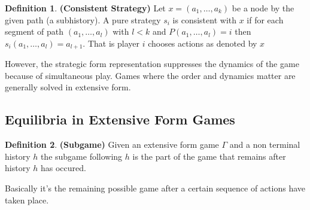 \documentclass{article}
\theoremstyle{definition}
\newtheorem{defn}{Definition}[section]
\begin{document}
\begin{defn}
\textbf{(Consistent Strategy)} Let $x=(a_1,\dots,a_k)$ be a node by the given path (a subhistory). A pure strategy $s_i$ is consistent with $x$ if for each segment of path $(a_1,\dots,a_l)$ with $l<k$ and $P(a_1,\dots,a_l)=i$ then $s_i(a_1,\dots,a_l) = a_{l+1}$. That is player $i$ chooses actions as denoted by $x$
\end{defn}
However, the strategic form representation suppresses the dynamics of the game because of simultaneous play. Games where the order and dynamics matter are generally solved in extensive form.
\subsection{Equilibria in Extensive Form Games}
\begin{defn}
\textbf{(Subgame)} Given an extensive form game $\Gamma$ and a non terminal history $h$ the subgame following $h$ is the part of the game that remains after history $h$ has occured.
\end{defn}
Basically it's the remaining possible game after a certain sequence of actions have taken place.
\end{document}
